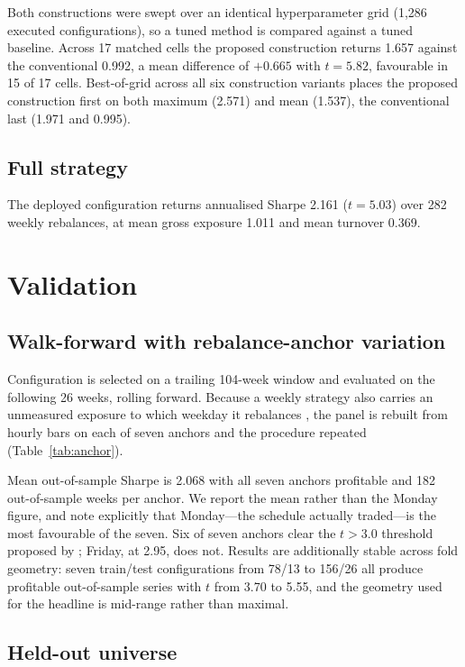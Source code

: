\documentclass[11pt,letterpaper]{article}
\begin{document}
Both constructions were swept over an identical hyperparameter grid (1,286
executed configurations), so a tuned method is compared against a tuned
baseline. Across 17 matched cells the proposed construction returns 1.657
against the conventional 0.992, a mean difference of $+0.665$ with
$t = 5.82$, favourable in 15 of 17 cells. Best-of-grid across all six
construction variants places the proposed construction first on both maximum
(2.571) and mean (1.537), the conventional last (1.971 and 0.995).

\subsection{Full strategy}

The deployed configuration returns annualised Sharpe 2.161 ($t = 5.03$) over 282
weekly rebalances, at mean gross exposure 1.011 and mean turnover 0.369.

\section{Validation}

\subsection{Walk-forward with rebalance-anchor variation}

Configuration is selected on a trailing 104-week window and evaluated on the
following 26 weeks, rolling forward. Because a weekly strategy also carries an
unmeasured exposure to which weekday it rebalances \citep{hoffstein2018}, the
panel is rebuilt from hourly bars on each of seven anchors and the procedure
repeated (Table~\ref{tab:anchor}).

Mean out-of-sample Sharpe is 2.068 with all seven anchors profitable and 182
out-of-sample weeks per anchor. We report the mean rather than the Monday
figure, and note explicitly that Monday---the schedule actually traded---is the
most favourable of the seven. Six of seven anchors clear the $t > 3.0$ threshold
proposed by \citet{harvey2016}; Friday, at 2.95, does not. Results are
additionally stable across fold geometry: seven train/test configurations from
78/13 to 156/26 all produce profitable out-of-sample series with $t$ from 3.70
to 5.55, and the geometry used for the headline is mid-range rather than
maximal.

\subsection{Held-out universe}
\end{document}
